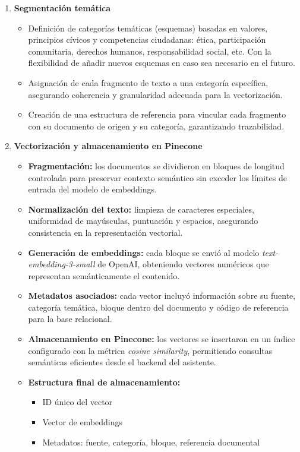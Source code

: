 \begin{enumerate}
      \item \textbf{Segmentación temática}
            \begin{itemize}
                  \item Definición de categorías temáticas (esquemas) basadas en valores, principios
                        cívicos y competencias ciudadanas: ética, participación comunitaria, derechos
                        humanos, responsabilidad social, etc. Con la flexibilidad de añadir nuevos
                        esquemas en caso sea necesario en el futuro.
                  \item Asignación de cada fragmento de texto a una categoría específica, asegurando
                        coherencia y granularidad adecuada para la vectorización.
                  \item Creación de una estructura de referencia para vincular cada fragmento con su
                        documento de origen y su categoría, garantizando trazabilidad.
            \end{itemize}

      \item \textbf{Vectorización y almacenamiento en Pinecone}
            \begin{itemize}
                  \item \textbf{Fragmentación:} los documentos se dividieron en bloques de longitud controlada para preservar contexto semántico sin exceder los límites de entrada del modelo de embeddings.
                  \item \textbf{Normalización del texto:} limpieza de caracteres especiales, uniformidad de mayúsculas, puntuación y espacios, asegurando consistencia en la representación vectorial.
                  \item \textbf{Generación de embeddings:} cada bloque se envió al modelo \textit{text-embedding-3-small} de OpenAI, obteniendo vectores numéricos que representan semánticamente el contenido.
                  \item \textbf{Metadatos asociados:} cada vector incluyó información sobre su fuente, categoría temática, bloque dentro del documento y código de referencia para la base relacional.
                  \item \textbf{Almacenamiento en Pinecone:} los vectores se insertaron en un índice configurado con la métrica \textit{cosine similarity}, permitiendo consultas semánticas eficientes desde el backend del asistente.
                  \item \textbf{Estructura final de almacenamiento:}
                        \begin{itemize}
                              \item ID único del vector
                              \item Vector de embeddings
                              \item Metadatos: fuente, categoría, bloque, referencia documental
                        \end{itemize}
            \end{itemize}
\end{enumerate}

